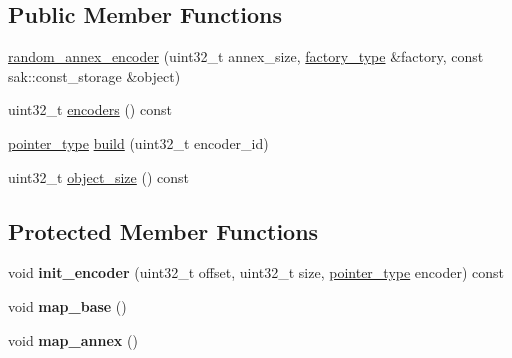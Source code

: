 \subsection*{Public Member Functions}
\begin{DoxyCompactItemize}
\item 
\hyperlink{classkodo_1_1random__annex__encoder_a90a30ec547715c238d654175f992f316}{random\-\_\-annex\-\_\-encoder} (uint32\-\_\-t annex\-\_\-size, \hyperlink{classkodo_1_1random__annex__encoder_a4e1a6314555e2254cb60c6825897b2fe}{factory\-\_\-type} \&factory, const sak\-::const\-\_\-storage \&object)
\item 
uint32\-\_\-t \hyperlink{classkodo_1_1random__annex__encoder_a235b7400e9e6f560db1f9a1d454ed5a3}{encoders} () const 
\item 
\hyperlink{classkodo_1_1random__annex__encoder_a63968d8f239e61728f22bffddcb26ea4}{pointer\-\_\-type} \hyperlink{classkodo_1_1random__annex__encoder_a7d8154bf5ab1f3e9a706d0767df58f08}{build} (uint32\-\_\-t encoder\-\_\-id)
\item 
uint32\-\_\-t \hyperlink{classkodo_1_1random__annex__encoder_a8833176485927c9bdf9773a6267e958d}{object\-\_\-size} () const 
\end{DoxyCompactItemize}
\subsection*{Protected Member Functions}
\begin{DoxyCompactItemize}
\item 
\hypertarget{classkodo_1_1random__annex__encoder_ab9000dae8e5bba6f7ead2cec5300181d}{void {\bfseries init\-\_\-encoder} (uint32\-\_\-t offset, uint32\-\_\-t size, \hyperlink{classkodo_1_1random__annex__encoder_a63968d8f239e61728f22bffddcb26ea4}{pointer\-\_\-type} encoder) const }\label{classkodo_1_1random__annex__encoder_ab9000dae8e5bba6f7ead2cec5300181d}

\item 
\hypertarget{classkodo_1_1random__annex__encoder_a5d2cb40c86b646019dcbfad4c1ded970}{void {\bfseries map\-\_\-base} ()}\label{classkodo_1_1random__annex__encoder_a5d2cb40c86b646019dcbfad4c1ded970}

\item 
\hypertarget{classkodo_1_1random__annex__encoder_a71cc23c3d82d3e54ddb59cae915069ba}{void {\bfseries map\-\_\-annex} ()}\label{classkodo_1_1random__annex__encoder_a71cc23c3d82d3e54ddb59cae915069ba}

\end{DoxyCompactItemize}
